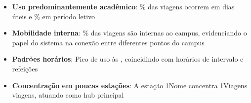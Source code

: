 \begin{itemize}
  \item \textbf{Uso predominantemente acadêmico}: \percentualDiasUteis\% das 
        viagens ocorrem em dias úteis e \percentualPeriodoLetivo\% em período letivo
  
  \item \textbf{Mobilidade interna}: \percentualInternas\% das viagens são 
        internas ao campus, evidenciando o papel do sistema na conexão entre 
        diferentes pontos do campus
  
  \item \textbf{Padrões horários}: Pico de uso às \horaPico{}, coincidindo 
        com horários de intervalo e refeições
  
  \item \textbf{Concentração em poucas estações}: A estação \topEstacao1Nome{} 
        concentra \topEstacao1Viagens{} viagens, atuando como hub principal
\end{itemize}

